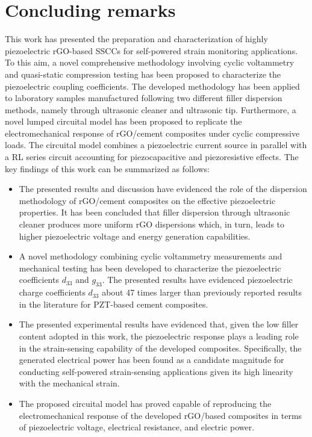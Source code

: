 \documentclass[a4paper,fleqn]{cas-sc}
\begin{document}

\section{Concluding remarks}\label{Sect3}

This work has presented the preparation and characterization of highly piezoelectric rGO-based SSCCs for self-powered strain monitoring applications. To this aim, a novel comprehensive methodology involving cyclic voltammetry and quasi-static compression testing has been proposed to characterize the piezoelectric coupling coefficients. The developed methodology has been applied to laboratory samples manufactured following two different filler dispersion methods, namely through ultrasonic cleaner and ultrasonic tip. Furthermore, a novel lumped circuital model has been proposed to replicate the electromechanical response of rGO/cement composites under cyclic compressive loads. The circuital model combines a piezoelectric current source in parallel with a RL series circuit accounting for piezocapacitive and piezoresistive effects. The key findings of this work can be summarized as follows:

\begin{itemize}
    \item The presented results and discussion have evidenced the role of the dispersion methodology of rGO/cement composites on the effective piezoelectric properties. It has been concluded that filler dispersion through ultrasonic cleaner produces more uniform rGO dispersions which, in turn, leads to higher piezoelectric voltage and energy generation capabilities.
    
    \item A novel methodology combining cyclic voltammetry measurements and mechanical testing has been developed to characterize the piezoelectric coefficients $d_{33}$ and $g_{33}$. The presented results have evidenced piezoelectric charge coefficients $d_{33}$ about 47 times larger than previously reported results in the literature for PZT-based cement composites.
    
    \item The presented experimental results have evidenced that, given the low filler content adopted in this work, the piezoelectric response plays a leading role in the strain-sensing capability of the developed composites. Specifically, the generated electrical power has been found as a candidate magnitude for conducting self-powered strain-sensing applications given its high linearity with the mechanical strain.
    
    \item The proposed circuital model has proved capable of reproducing the electromechanical response of the developed rGO/based composites in terms of piezoelectric voltage, electrical resistance, and electric power.
\end{itemize}
\end{document}
